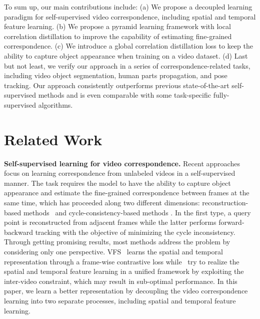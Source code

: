 \documentclass{article}
\begin{document}
To sum up, our main contributions include: (a) We propose a decoupled learning paradigm for self-supervised video correspondence, including spatial and temporal feature learning. (b) We propose a pyramid learning framework with local correlation distillation to improve the capability of estimating fine-grained correspondence. (c) We introduce a global correlation distillation loss to keep the ability to capture object appearance when training on a video dataset. (d) Last but not least, we verify our approach in a series of correspondence-related tasks, including video object segmentation, human parts propagation, and pose tracking. Our approach consistently outperforms previous state-of-the-art self-supervised methods and is even comparable with some task-specific fully-supervised algorithms.

\section{Related Work}
\textbf{Self-supervised learning for video correspondence.} 
Recent approaches focus on learning correspondence from unlabeled videos in a self-supervised manner. The task requires the model to have the ability to capture object appearance and estimate the fine-grained correspondence between frames at the same time, which has proceeded along two different dimensions: reconstruction-based methods~\cite{lai2019self}\cite{lai2020mast}\cite{li2019joint}\cite{vondrick2018tracking}\cite{wang2020contrastive} and cycle-consistency-based methods \cite{jabri2020space}\cite{wang2019learning}\cite{zhao2021modelling}. In the first type, a query point is reconstructed from adjacent frames while the latter performs forward-backward tracking with the objective of minimizing the cycle inconsistency. Through getting promising results, most methods address the problem by considering only one perspective. VFS~\cite{xu2021rethinking} learns the spatial and temporal representation through a frame-wise contrastive loss while~\cite{araslanov2021dense}\cite{wang2020contrastive} try to realize the spatial and temporal feature learning in a unified framework by exploiting the inter-video constraint, which may result in sub-optimal performance. In this paper, we learn a better representation by decoupling the video correspondence learning into two separate processes, including spatial and temporal feature learning.
\end{document}

